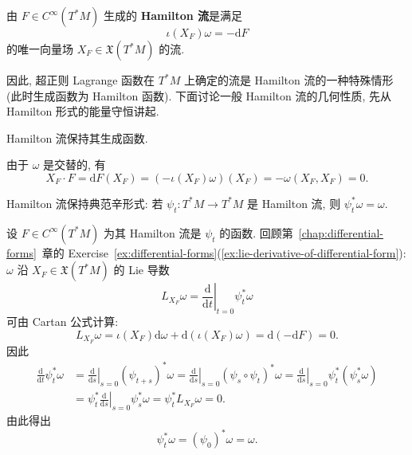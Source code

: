 \begin{RiemannDefinition}\label{def:hamiltonian-flow}
由 $F\in C^\infty(T^*M)$ 生成的 \textbf{Hamilton 流}是满足
\[
  \iota(X_F)\omega=-\mathrm{d}F
\]
的唯一向量场 $X_F\in\mathfrak{X}(T^*M)$ 的流.
\end{RiemannDefinition}

因此, 超正则 Lagrange 函数在 $T^*M$ 上确定的流是 Hamilton 流的一种特殊情形 (此时生成函数为 Hamilton 函数). 下面讨论一般 Hamilton 流的几何性质, 先从 Hamilton 形式的能量守恒讲起.

\begin{RiemannProposition}\label{prop:hamiltonian-flow-preserves-generator}
Hamilton 流保持其生成函数.
\end{RiemannProposition}

\begin{RiemannProof}
由于 $\omega$ 是交替的, 有
\[
  X_F\cdot F=\mathrm{d}F(X_F)=(-\iota(X_F)\omega)(X_F)=-\omega(X_F,X_F)=0.
\]
\end{RiemannProof}

\begin{RiemannProposition}\label{prop:hamiltonian-flow-preserves-symplectic-form}
Hamilton 流保持典范辛形式: 若 $\psi_t:T^*M\to T^*M$ 是 Hamilton 流, 则 $\psi_t^*\omega=\omega$.
\end{RiemannProposition}

\begin{RiemannProof}
设 $F\in C^\infty(T^*M)$ 为其 Hamilton 流是 $\psi_t$ 的函数. 回顾第~\ref{chap:differential-forms}~章的 Exercise~\ref{ex:differential-forms}(\ref{ex:lie-derivative-of-differential-form}): $\omega$ 沿 $X_F\in\mathfrak{X}(T^*M)$ 的 Lie 导数
\[
  L_{X_F}\omega=\left.\frac{\mathrm{d}}{\mathrm{d}t}\right|_{t=0}\psi_t^*\omega
\]
可由 Cartan 公式计算:
\[
  L_{X_F}\omega=\iota(X_F)\mathrm{d}\omega
  +\mathrm{d}(\iota(X_F)\omega)=\mathrm{d}(-\mathrm{d}F)=0.
\]
因此
\begin{align*}
  \frac{\mathrm{d}}{\mathrm{d}t}\psi_t^*\omega
  &=\left.\frac{\mathrm{d}}{\mathrm{d}s}\right|_{s=0}(\psi_{t+s})^*\omega
   =\left.\frac{\mathrm{d}}{\mathrm{d}s}\right|_{s=0}(\psi_s\circ\psi_t)^*\omega
   =\left.\frac{\mathrm{d}}{\mathrm{d}s}\right|_{s=0}\psi_t^*(\psi_s^*\omega)\\
  &=\psi_t^*\left.\frac{\mathrm{d}}{\mathrm{d}s}\right|_{s=0}\psi_s^*\omega
   =\psi_t^*L_{X_F}\omega=0.
\end{align*}
由此得出
\[
  \psi_t^*\omega=(\psi_0)^*\omega=\omega.
\]
\end{RiemannProof}

